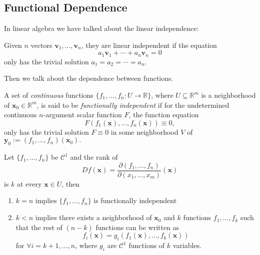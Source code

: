 \subsection{Functional Dependence}
In linear algebra we have talked about the linear independence:
\begin{definition}
Given $n$ vectors $\bm v_1,\dots,\bm v_n$, they are linear independent if the equation
\[
a_1\bm v_1+\cdots+a_n\bm v_n=0
\]
only has the trivial solution $a_1=a_2=\cdots=a_n$.
\end{definition}

Then we talk about the dependence between functions.
\begin{definition}[Dependence]
A set of \emph{continuous} functions $\{f_1,\dots,f_n: U\to\mathbb{R}\}$, where $U\subseteq\mathbb{R}^m$ is a neighborhood of $\bm x_0\in\mathbb{R}^m$, is said to be \emph{functionally independent} if for the undetermined continuous $n$-argument scalar function $F$, the function equation
\begin{equation}
F(f_1(\bm x),\dots,f_n(\bm x))\equiv0,\label{Eq:12:1}
\end{equation}
only has the trivial solution $F\equiv0$ in some neighborhood $V$ of $\bm y_0:=(f_1,\dots,f_n)(\bm x_0).$
\end{definition}
\begin{proposition}
Let $\{f_1,\dots,f_n\}$ be $\mathcal{C}^1$ and the rank of
\[
Df(\bm x)=
\frac{\partial (f_1,\dots,f_n)}{\partial(x_1,\dots,x_m)}(\bm x)
\]
is $k$ at every $\bm x\in U$, then 
\begin{enumerate}
\item
$k=n$ implies $\{f_1,\dots,f_n\}$ is functionally independent
\item
$k<n$ implies there exists a neighborhood of $\bm x_0$ and $k$ functions $f_1,\dots,f_k$ such that the rest of $(n-k)$ functions can be written as
\[
f_i(\bm x)=g_i(f_1(\bm x),\dots,f_k(\bm x))
\]
for $\forall i=k+1,\dots,n$, where $g_i$ are $\mathcal{C}^1$ functions of $k$ variables.
\end{enumerate}
\end{proposition}

